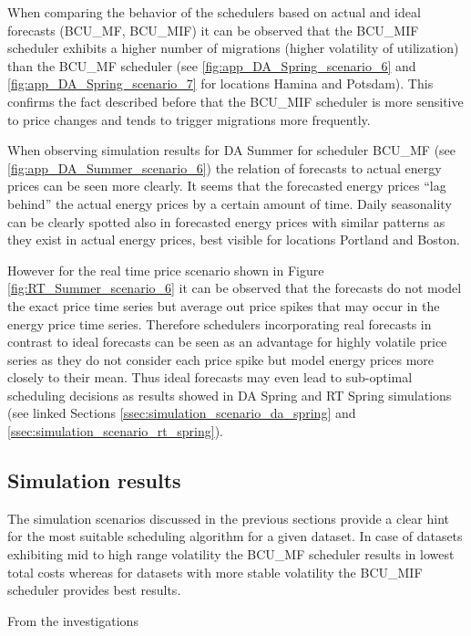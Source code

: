 When comparing the behavior of the schedulers based on actual and ideal forecasts (BCU\_MF, BCU\_MIF) it can be observed that the BCU\_MIF scheduler exhibits a higher number of migrations (higher volatility of utilization) than the BCU\_MF scheduler (see \ref{fig:app_DA_Spring_scenario_6} and \ref{fig:app_DA_Spring_scenario_7} for locations Hamina and Potsdam). This confirms the fact described before that the BCU\_MIF scheduler is more sensitive to price changes and tends to trigger migrations more frequently. 

When observing simulation results for DA Summer for scheduler BCU\_MF (see \ref{fig:app_DA_Summer_scenario_6}) the relation of forecasts to actual energy prices can be seen more clearly. It seems that the forecasted energy prices ``lag behind'' the actual energy prices by a certain amount of time. Daily seasonality can be clearly spotted also in forecasted energy prices with similar patterns as they exist in actual energy prices, best visible for locations Portland and Boston. 

However for the real time price scenario shown in Figure \ref{fig:RT_Summer_scenario_6} it can be observed that the forecasts do not model the exact price time series but average out price spikes that may occur in the energy price time series. Therefore schedulers incorporating real forecasts in contrast to ideal forecasts can be seen as an advantage for highly volatile price series as they do not consider each price spike but model energy prices more closely to their mean. 
Thus ideal forecasts may even lead to sub-optimal scheduling decisions as results showed in DA Spring and RT Spring simulations (see linked Sections \ref{ssec:simulation_scenario_da_spring} and \ref{ssec:simulation_scenario_rt_spring}). 


\subsection{Simulation results}

The simulation scenarios discussed in the previous sections provide a clear hint for the most suitable scheduling algorithm for a given dataset. 
In case of datasets exhibiting mid to high range volatility the BCU\_MF scheduler results in lowest total costs whereas for datasets with more stable volatility the BCU\_MIF scheduler provides best results. 


From the investigations 

